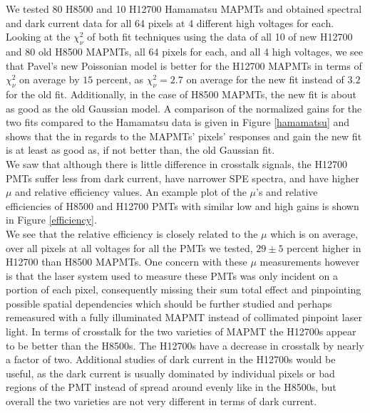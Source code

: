 \documentclass[prc,twocolumn]{revtex4}
\begin{document}
	We tested 80 H8500 and 10 H12700 Hamamatsu MAPMTs and obtained spectral and dark current data for all 64 pixels at 4 different high voltages for each. Looking at the $\chi^{2}_{\nu}$ of both fit techniques using the data of all 10 of new H12700 and 80 old H8500 MAPMTs, all 64 pixels for each, and all 4 high voltages, we see that Pavel's new Poissonian model is better for the H12700 MAPMTs in terms of $\chi^{2}_{\nu}$ on average by $15$ percent, as $\chi^{2}_{\nu} = 2.7$ on average for the new fit instead of $3.2$ for the old fit. Additionally, in the case of H8500 MAPMTs, the new fit is about as good as the old Gaussian model. A comparison of the normalized gains for the two fits compared to the Hamamatsu data is given in Figure \ref{hamamatsu} and shows that the in regards to the MAPMTs' pixels' responses and gain the new fit is at least as good as, if not better than, the old Gaussian fit.
	\\	
	\indent  We saw that although there is little difference in crosstalk signals, the H12700 PMTs suffer less from dark current, have narrower SPE spectra, and have higher $\mu$ and relative efficiency values. An example plot of the $\mu$'s and relative efficiencies of H8500 and H12700 PMTs with similar low and high gains is shown in Figure \ref{efficiency}.
	\\	%
	\indent We see that the relative efficiency is closely related to the $\mu$ which is on average, over all pixels at all voltages for all the PMTs we tested, $29\pm5$ percent higher in H12700 than H8500 MAPMTs. One concern with these $\mu$ measurements however is that the laser system used to measure these PMTs was only incident on a portion of each pixel, consequently missing their sum total effect and pinpointing possible spatial dependencies which should be further studied and perhaps remeasured with a fully illuminated MAPMT instead of collimated pinpoint laser light. In terms of crosstalk for the two varieties of MAPMT the H12700s appear to be better than the H8500s. The H12700s have a decrease in crosstalk by nearly a factor of two. Additional studies of dark current in the H12700s would be useful, as the dark current is usually dominated by individual pixels or bad regions of the PMT instead of spread around evenly like in the H8500s, but overall the two varieties are not very different in terms of dark current.
\end{document}
